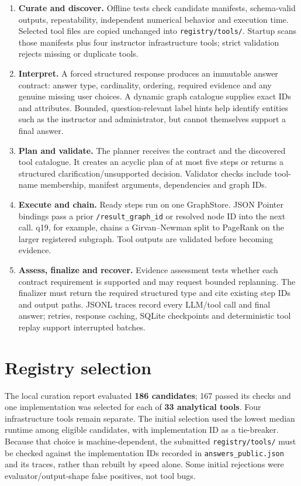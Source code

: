 \documentclass[10pt,a4paper]{article}
\newcommand{\tool}[1]{\texttt{#1}}
\begin{document}
\begin{enumerate}
\item \textbf{Curate and discover.} Offline tests check candidate manifests, schema-valid outputs,
  repeatability, independent numerical behavior and execution time. Selected tool files are copied unchanged
  into \tool{registry/tools/}. Startup scans those manifests plus four instructor infrastructure tools; strict
  validation rejects missing or duplicate tools.
\item \textbf{Interpret.} A forced structured response produces an immutable answer contract: answer type,
  cardinality, ordering, required evidence and any genuine missing user choices. A dynamic graph catalogue
  supplies exact IDs and attributes. Bounded, question-relevant label hints help identify entities such as
  the instructor and administrator, but cannot themselves support a final answer.
\item \textbf{Plan and validate.} The planner receives the contract and the discovered tool catalogue. It
  creates an acyclic plan of at most five steps or returns a structured clarification/unsupported decision.
  Validator checks include tool-name membership, manifest arguments, dependencies and graph IDs.
\item \textbf{Execute and chain.} Ready steps run on one GraphStore. JSON Pointer bindings pass a prior
  \tool{/result\_graph\_id} or resolved node ID into the next call. q19, for example, chains a Girvan--Newman
  split to PageRank on the larger registered subgraph. Tool outputs are validated before becoming evidence.
\item \textbf{Assess, finalize and recover.} Evidence assessment tests whether each contract requirement
  is supported and may request bounded replanning. The finalizer must return the required structured type
  and cite existing step IDs and output paths. JSONL traces record every LLM/tool call and final answer;
  retries, response caching, SQLite checkpoints and deterministic tool replay support interrupted batches.
\end{enumerate}

\section{Registry selection}
The local curation report evaluated \textbf{186 candidates}; 167 passed its checks and one implementation was
selected for each of \textbf{33 analytical tools}. Four infrastructure tools remain separate. The initial
selection used the lowest median runtime among eligible candidates, with implementation ID as a tie-breaker.
Because that choice is machine-dependent, the submitted \tool{registry/tools/} must be checked against the
implementation IDs recorded in \tool{answers\_public.json} and its traces, rather than rebuilt by speed alone.
Some initial rejections were evaluator/output-shape false positives, not tool bugs.
\end{document}
